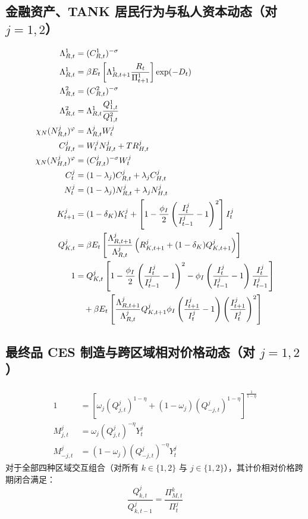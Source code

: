 \documentclass[12pt,UTF8]{ctexart}
\begin{document}
	\subsection{金融资产、TANK 居民行为与私人资本动态（对 \texorpdfstring{$j=1,2$}{j=1,2}）}
	\begin{align}
		\Lambda_{R,t}^1 &=(C_{R,t}^1)^{-\sigma} \label{a1}\\
		\Lambda_{R,t}^1 &=\beta E_t\left[\Lambda_{R,t+1}^1\frac{R_t}{\Pi_{t+1}^1}\right]\exp(-D_t) \label{a2}\\
		\Lambda_{R,t}^2 &=(C_{R,t}^2)^{-\sigma} \label{a3}\\
		\Lambda_{R,t}^2 &=\Lambda_{R,t}^1\frac{Q_{1,t}^1}{Q_{1,t}^2} \label{a4}\\
		\chi_N(N_{R,t}^j)^{\varphi} &=\Lambda_{R,t}^jW_t^j \label{a5}\\
		C_{H,t}^j &=W_t^jN_{H,t}^j+TR_{H,t}^j \label{a6}\\
		\chi_N(N_{H,t}^j)^{\varphi} &=(C_{H,t}^j)^{-\sigma}W_t^j \label{a7}\\
		C_t^j &=(1-\lambda_j)C_{R,t}^j+\lambda_jC_{H,t}^j \label{a8}\\
		N_t^j &=(1-\lambda_j)N_{R,t}^j+\lambda_jN_{H,t}^j \label{a9}\\
		K_{t+1}^j &=(1-\delta_K)K_t^j+ \left[1-\frac{\phi_I}{2}\left(\frac{I_t^j}{I_{t-1}^j}-1\right)^2\right]I_t^j \label{a10}\\
		Q_{K,t}^j
		&=\beta E_t\left[
		\frac{\Lambda_{R,t+1}^j}{\Lambda_{R,t}^j}
		\left(R_{K,t+1}^j+(1-\delta_K)Q_{K,t+1}^j\right)
		\right] \label{a11}\\
		1
		&=Q_{K,t}^j
		\left[
		1-\frac{\phi_I}{2}\left(\frac{I_t^j}{I_{t-1}^j}-1\right)^2
		-\phi_I\left(\frac{I_t^j}{I_{t-1}^j}-1\right)\frac{I_t^j}{I_{t-1}^j}
		\right] \notag\\
		&\quad+\beta E_t\left[
		\frac{\Lambda_{R,t+1}^j}{\Lambda_{R,t}^j}
		Q_{K,t+1}^j
		\phi_I\left(\frac{I_{t+1}^j}{I_t^j}-1\right)
		\left(\frac{I_{t+1}^j}{I_t^j}\right)^2
		\right] \label{a12}
	\end{align}
	
	\subsection{最终品 CES 制造与跨区域相对价格动态（对 \texorpdfstring{$j=1,2$}{j=1,2}）}
	\begin{align}
		1 &=\left[ \omega_j(Q_{j,t}^j)^{1-\eta} +(1-\omega_j)(Q_{-j,t}^j)^{1-\eta} \right]^{\frac{1}{1-\eta}} \label{a13}\\
		M_{j,t}^j &=\omega_j(Q_{j,t}^j)^{-\eta}Y_t^j \label{a14}\\
		M_{-j,t}^j &=(1-\omega_j)(Q_{-j,t}^j)^{-\eta}Y_t^j \label{a15}
	\end{align}
	对于全部四种区域交互组合（对所有 $k \in \{1,2\}$ 与 $j \in \{1,2\}$），其计价相对价格跨期闭合满足：
	\begin{equation}
		\frac{Q_{k,t}^j}{Q_{k,t-1}^j}=\frac{\Pi_{M,t}^k}{\Pi_t^j} \label{a16}
	\end{equation}
	
\end{document}
